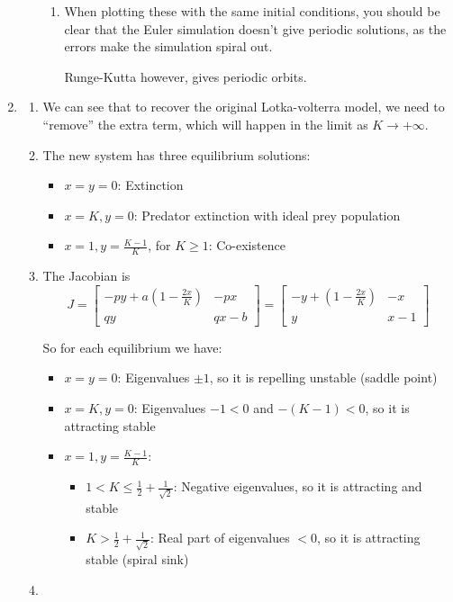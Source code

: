 \begin{enumerate}
\begin{enumerate}
\begin{enumerate}
		\item When plotting these with the same initial conditions, you should be clear that the Euler simulation doesn't give periodic solutions, as the errors make the simulation spiral out.
		
		Runge-Kutta however, gives periodic orbits.
		
		
	\end{enumerate}
		
	
\end{enumerate}
	
	
	
	
\item
\begin{enumerate}
	\item  We can see that to recover the original Lotka-volterra model, we need to ``remove'' the extra term, which will happen in the limit as $K \to +\infty$.
	
	\item The new system has three equilibrium solutions:
	\begin{itemize}
		\item $x=y=0$: Extinction
		\item $x=K, y=0$: Predator extinction with ideal prey population
		\item $x=1, y=\frac{K-1}{K}$, for $K\geq 1$: Co-existence
	\end{itemize}
	
	\item The Jacobian is
	\[
	J = \begin{bmatrix}
		-py+a\left(1-\frac{2x}{K}\right) & -px \\
		qy & qx-b
	\end{bmatrix}
	= \begin{bmatrix}
		-y+\left(1-\frac{2x}{K}\right) & -x \\
		y & x-1
	\end{bmatrix}
	\]
	
	So for each equilibrium we have:
	\begin{itemize}
		\item $x=y=0$: Eigenvalues $\pm 1$, so it is repelling unstable (saddle point)
		\item $x=K, y=0$: Eigenvalues $-1<0$ and $-(K-1)<0$, so it is attracting stable
		\item $x=1, y = \frac{K-1}{K}$: 
		\begin{itemize}
			\item[] $1 < K \leq  \frac12+\frac{1}{\sqrt{2}}$: Negative eigenvalues, so it is attracting and stable
			\item[] $K > \frac12+\frac{1}{\sqrt{2}}$: Real part of eigenvalues $<0$, so it is attracting stable (spiral sink)	
		\end{itemize}
	\end{itemize}

	\item 
	
\end{enumerate}	
\end{enumerate}
